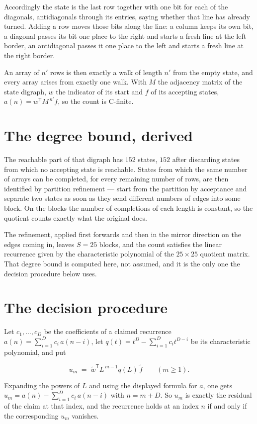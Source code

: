 \documentclass[11pt]{article}
\theoremstyle{definition}
\begin{document}
Accordingly the state is the last row together with one bit for each of the diagonals, antidiagonals through its entries, saying whether that line has already turned. Adding a row moves those bits along the line: a column keeps its own bit, a diagonal passes its bit one place to the right and starts a fresh line at the left border, an antidiagonal passes it one place to the left and starts a fresh line at the right border.

An array of $n'$ rows is then exactly a walk of length $n'$ from the empty state, and every array arises from exactly one walk. With $M$ the adjacency matrix of the state digraph, $w$ the indicator of its start and $f$ of its accepting states, $a(n) = w^{\mathsf T}M^{\,n'}f$, so the count is C-finite.

\section{The degree bound, derived}

The reachable part of that digraph has $152$ states, $152$ after discarding states from which no accepting state is reachable. States from which the same number of arrays can be completed, for every remaining number of rows, are then identified by partition refinement --- start from the partition by acceptance and separate two states as soon as they send different numbers of edges into some block. On the blocks the number of completions of each length is constant, so the quotient counts exactly what the original does.

The refinement, applied first forwards and then in the mirror direction on the edges coming in, leaves $S = 25$ blocks, and the count satisfies the linear recurrence given by the characteristic polynomial of the $25 \times 25$ quotient matrix. That degree bound is computed here, not assumed, and it is the only one the decision procedure below uses.

\section{The decision procedure}

Let $c_1,\dots,c_D$ be the coefficients of a claimed recurrence $a(n) = \sum_{i=1}^{D} c_i\,a(n-i)$, let $q(t) = t^{D} - \sum_{i=1}^{D} c_i t^{D-i}$ be its characteristic polynomial, and put

\[u_m \;=\; \tilde w^{\mathsf T} L^{\,m-1} q(L)\,\tilde f \qquad (m \ge 1).\]

Expanding the powers of $L$ and using the displayed formula for $a$, one gets $u_m = a(n) - \sum_{i=1}^{D} c_i\,a(n-i)$ with $n = m + D$. So $u_m$ is exactly the residual of the claim at that index, and the recurrence holds at an index $n$ if and only if the corresponding $u_m$ vanishes.
\end{document}
